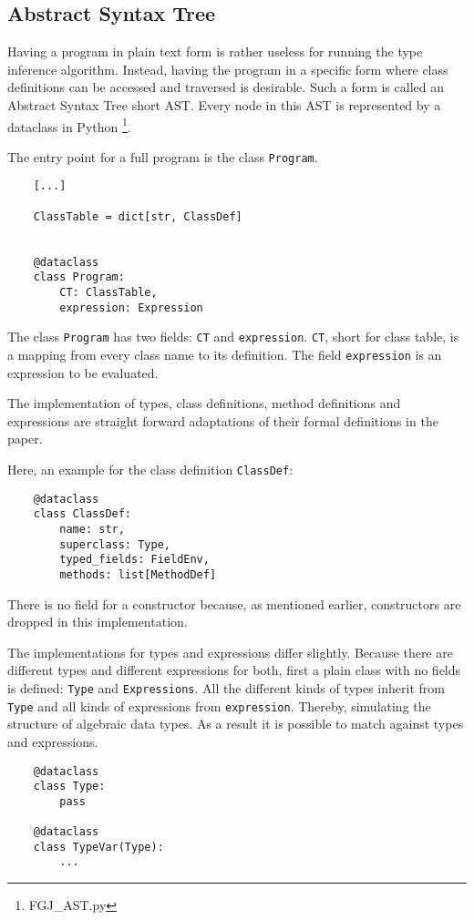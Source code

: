 \subsection{Abstract Syntax Tree}

Having a program in plain text form is rather useless for running the type inference algorithm. Instead, having the program in a specific form where class definitions can be accessed and traversed is desirable.
Such a form is called an Abstract Syntax Tree short AST. Every node in this AST is represented by a dataclass in Python \footnote{FGJ\_AST.py}.

The entry point for a full program is the class \verb|Program|.
\begin{verbatim}
    [...]

    ClassTable = dict[str, ClassDef]


    @dataclass
    class Program:
        CT: ClassTable,
        expression: Expression
\end{verbatim}

The class \verb|Program| has two fields: \verb|CT| and \verb|expression|. \verb|CT|, short for class table, is a mapping from every class name to its definition. The field \verb|expression| is an expression to be evaluated.

The implementation of types, class definitions, method definitions and expressions are straight forward adaptations of their formal definitions in the paper.

Here, an example for the class definition \verb|ClassDef|:
\begin{verbatim}
    @dataclass
    class ClassDef:
        name: str,
        superclass: Type,
        typed_fields: FieldEnv,
        methods: list[MethodDef]
\end{verbatim}

There is no field for a constructor because, as mentioned earlier, constructors are dropped in this implementation.

The implementations for types and expressions differ slightly. Because there are different types and different expressions for both, first a plain class with no fields is defined: \verb|Type| and \verb|Expressions|. All the different kinds of types inherit from \verb|Type| and all kinds of expressions from \verb|expression|. Thereby, simulating the structure of algebraic data types.
As a result it is possible to match against types and expressions.

\begin{verbatim}
    @dataclass
    class Type:
        pass

    @dataclass
    class TypeVar(Type):
        ...
\end{verbatim}

